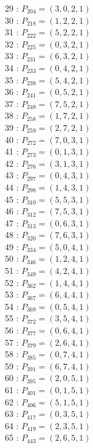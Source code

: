 \documentclass{article}
\begin{document}
{\begin{multicols}{3}
29 : $P_{204}=( 3, 0, 2, 1 )$\\
30 : $P_{218}=( 1, 2, 2, 1 )$\\
31 : $P_{222}=( 5, 2, 2, 1 )$\\
32 : $P_{225}=( 0, 3, 2, 1 )$\\
33 : $P_{231}=( 6, 3, 2, 1 )$\\
34 : $P_{233}=( 0, 4, 2, 1 )$\\
35 : $P_{238}=( 5, 4, 2, 1 )$\\
36 : $P_{241}=( 0, 5, 2, 1 )$\\
37 : $P_{248}=( 7, 5, 2, 1 )$\\
38 : $P_{258}=( 1, 7, 2, 1 )$\\
39 : $P_{259}=( 2, 7, 2, 1 )$\\
40 : $P_{272}=( 7, 0, 3, 1 )$\\
41 : $P_{273}=( 0, 1, 3, 1 )$\\
42 : $P_{276}=( 3, 1, 3, 1 )$\\
43 : $P_{297}=( 0, 4, 3, 1 )$\\
44 : $P_{298}=( 1, 4, 3, 1 )$\\
45 : $P_{310}=( 5, 5, 3, 1 )$\\
46 : $P_{312}=( 7, 5, 3, 1 )$\\
47 : $P_{313}=( 0, 6, 3, 1 )$\\
48 : $P_{320}=( 7, 6, 3, 1 )$\\
49 : $P_{334}=( 5, 0, 4, 1 )$\\
50 : $P_{346}=( 1, 2, 4, 1 )$\\
51 : $P_{349}=( 4, 2, 4, 1 )$\\
52 : $P_{362}=( 1, 4, 4, 1 )$\\
53 : $P_{367}=( 6, 4, 4, 1 )$\\
54 : $P_{369}=( 0, 5, 4, 1 )$\\
55 : $P_{372}=( 3, 5, 4, 1 )$\\
56 : $P_{377}=( 0, 6, 4, 1 )$\\
57 : $P_{379}=( 2, 6, 4, 1 )$\\
58 : $P_{385}=( 0, 7, 4, 1 )$\\
59 : $P_{391}=( 6, 7, 4, 1 )$\\
60 : $P_{395}=( 2, 0, 5, 1 )$\\
61 : $P_{401}=( 0, 1, 5, 1 )$\\
62 : $P_{406}=( 5, 1, 5, 1 )$\\
63 : $P_{417}=( 0, 3, 5, 1 )$\\
64 : $P_{419}=( 2, 3, 5, 1 )$\\
65 : $P_{443}=( 2, 6, 5, 1 )$\\

\end{multicols}}
\end{document}
